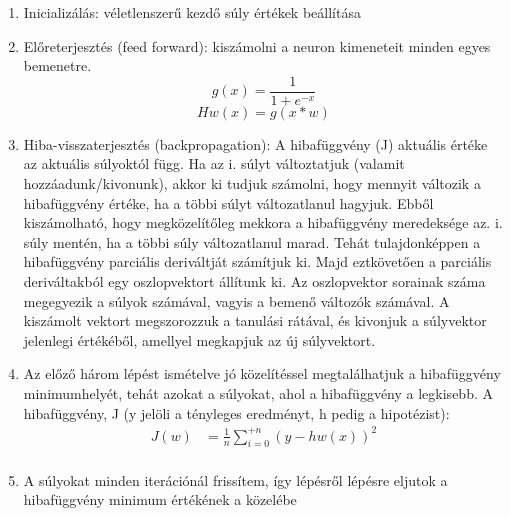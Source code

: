 \begin{enumerate}
	\item Inicializálás: véletlenszerű kezdő súly értékek beállítása
	\item Előreterjesztés (feed forward): kiszámolni a neuron kimeneteit minden egyes bemenetre.
	\[
    	g(x) = \frac{1}{1 + e^{-x}}
	\]
	\[
    	Hw(x) = g(x*w)
	\]
	\item Hiba-visszaterjesztés (backpropagation): A hibafüggvény (J) aktuális értéke az aktuális súlyoktól függ. Ha az i. súlyt változtatjuk (valamit hozzáadunk/kivonunk), akkor ki tudjuk számolni, hogy mennyit változik a hibafüggvény értéke, ha a többi súlyt változatlanul hagyjuk. Ebből kiszámolható, hogy megközelítőleg mekkora a hibafüggvény meredeksége az. i. súly mentén, ha a többi súly változatlanul marad. Tehát tulajdonképpen a hibafüggvény parciális deriváltját számítjuk ki. Majd eztkövetően  a parciális deriváltakból egy oszlopvektort állítunk ki. Az oszlopvektor sorainak száma megegyezik a súlyok számával, vagyis a bemenő változók számával. A kiszámolt vektort megszorozzuk a tanulási rátával, és kivonjuk a súlyvektor jelenlegi értékéből, amellyel megkapjuk az új súlyvektort.
	\item Az előző három lépést ismételve jó közelítéssel megtalálhatjuk a hibafüggvény minimumhelyét, tehát azokat a súlyokat, ahol a hibafüggvény a legkisebb.
A hibafüggvény, J (y jelöli a tényleges eredményt, h pedig a hipotézist):
	\begin{align*}
  		J(w) &= \frac{1}{n}\sum_{i=0}^{+n} (y - hw(x))^2 \\
	\end{align*}
	\item A súlyokat minden iterációnál frissítem, így lépésről lépésre eljutok a hibafüggvény minimum értékének a közelébe
\end{enumerate}
\paragraph{}